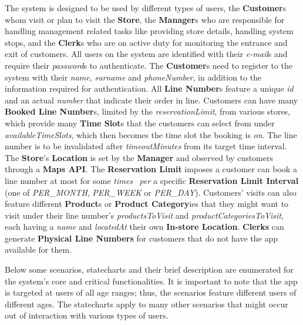 The system is designed to be used by different types of users, the \textbf{Customer}s whom visit or plan to visit the \textbf{Store}, the \textbf{Manager}s who are responsible for handling management related tasks like providing store details, handling system stops, and the \textbf{Clerk}s who are on active duty for monitoring the entrance and exit of customers.
All users on the system are identified with their \textit{e-mail}s and require their \textit{password}s to authenticate.
The \textbf{Customer}s need to register to the system with their \textit{name}, \textit{surname} and \textit{phoneNumber}, in addition to the information required for authentication.
All \textbf{Line Number}s feature a unique \textit{id} and an actual \textit{number} that indicate their order in line.
Customers can have many \textbf{Booked Line Number}s, limited by the \textit{reservationLimit}, from various stores, which provide many \textbf{Time Slot}s that the customers can select from under \textit{availableTimeSlots}, which then becomes the time slot the booking is \textit{on}.
The line number is to be invalidated after \textit{timeoutMinutes} from its target time interval.
The \textbf{Store}'s \textbf{Location} is set by the \textbf{Manager} and observed by customers through a \textbf{Maps API}.
The \textbf{Reservation Limit} imposes a customer can book a line number at most for some \textit{times} \ \textit{per} a specific \textbf{Reservation Limit Interval} (one of \textit{PER\_MONTH}, \textit{PER\_WEEK} or \textit{PER\_DAY}).
Customers' visits can also feature different \textbf{Product}s or \textbf{Product Category}ies that they might want to visit under their line number's \textit{productsToVisit} and \textit{productCategoriesToVisit}, each having a \textit{name} and \textit{locatedAt} their own \textbf{In-store Location}.
\textbf{Clerks} can generate \textbf{Physical Line Numbers} for customers that do not have the app available for them.

Below some scenarios, statecharts and their brief description are enumerated for the system's core and critical functionalities.
It is important to note that the app is targeted at users of all age ranges; thus, the scenarios feature different users of different ages.
The statecharts apply to many other scenarios that might occur out of interaction with various types of users.


